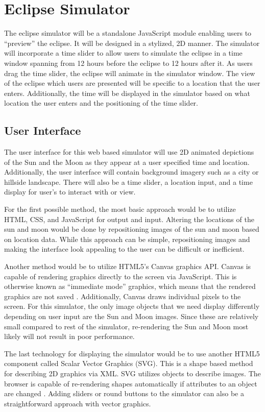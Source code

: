 \documentclass[10pt, onecolumn, draftclsnofoot, letterpaper, compsoc]{IEEEtran}
\begin{document}
\section{Eclipse Simulator}
The eclipse simulator will be a standalone JavaScript module enabling users to
“preview” the eclipse. It will be designed in a stylized, 2D manner.
The simulator will incorporate a time slider to allow users to simulate
the eclipse in a time window spanning from 12 hours before the eclipse to 12
hours after it. As users drag the time slider, the eclipse will animate in the
simulator window. The view of the eclipse which users are presented will be
specific to a location that the user enters. Additionally, the time will be
displayed in the simulator based on what location the user enters and the
positioning of the time slider.

\subsection{User Interface}

The user interface for this web based simulator will use 2D animated depictions
of the Sun and the Moon as they appear at a user specified time and location.
Additionally, the user interface will contain background imagery such as a
city or hillside landscape. There will also be a time slider, a location
input, and a time display for user’s to interact with or view.

For the first possible method, the most basic approach would be to utilize
HTML, CSS, and JavaScript for output and input. Altering the locations of the
sun and moon would be done by repositioning images of the sun and moon based on
location data. While this approach can be simple, repositioning images and
making the interface look appealing to the user can be difficult or
inefficient.

Another method would be to utilize HTML5’s Canvas graphics API. Canvas is
capable of rendering graphics directly to the screen via JavaScript. This is
otherwise known as “immediate mode” graphics, which means that the rendered
graphics are not saved \cite{SVGvsC}. Additionally, Canvas draws individual
pixels to the screen. For this simulator, the only image objects that we need
display differently depending on user input are the Sun and Moon images.
Since these are relatively small compared to rest of the simulator,
re-rendering the Sun and Moon most likely will not result in poor performance.

The last technology for displaying the simulator would be to use another HTML5
component called Scalar Vector Graphics (SVG). This is a shape based method
for describing 2D graphics via XML.  SVG utilizes objects to describe images.
The browser is capable of re-rendering shapes automatically if attributes to
an object are changed \cite{SVG}. Adding sliders or round buttons to the
simulator can also be a straightforward approach with vector graphics.
\end{document}
